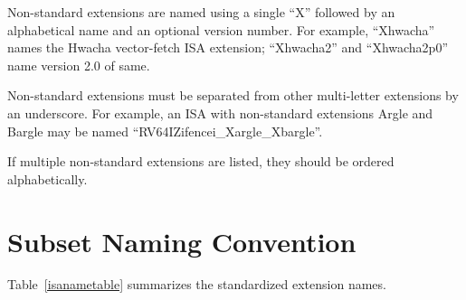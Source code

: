 Non-standard extensions are named using a single ``X'' followed by an
alphabetical name and an optional version number.
For example, ``Xhwacha'' names the Hwacha vector-fetch ISA extension;
``Xhwacha2'' and ``Xhwacha2p0'' name version 2.0 of same.

Non-standard extensions must be separated from other multi-letter extensions
by an underscore.  For example, an ISA with non-standard extensions
Argle and Bargle may be named ``RV64IZifencei\_Xargle\_Xbargle''.

If multiple non-standard extensions are listed, they should be ordered
alphabetically.

\section{Subset Naming Convention}
Table~\ref{isanametable} summarizes the standardized extension names.
~\\
